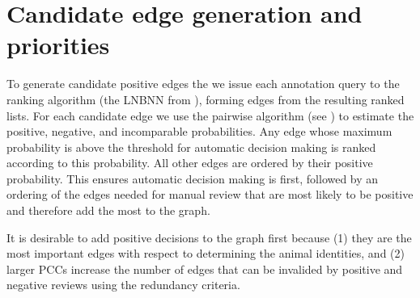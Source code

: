 


\section{Candidate edge generation and priorities}\label{sec:cand}

To generate candidate positive edges the we issue each annotation query to the
ranking algorithm (the LNBNN from ), forming edges from the
resulting ranked lists. For each candidate edge we use the pairwise algorithm
(see ) to estimate the positive, negative, and incomparable
probabilities. Any edge whose maximum probability is above the threshold for
automatic decision making is ranked according to this probability. All other
edges are ordered by their positive probability. This ensures automatic
decision making is first, followed by an ordering of the edges needed for
manual review that are most likely to be positive and therefore add the most to
the graph.

It is desirable to add positive decisions to the graph first because (1) they
are the most important edges with respect to determining the animal identities,
and (2) larger PCCs increase the number of edges that can be invalided by
positive and negative reviews using the redundancy criteria.

